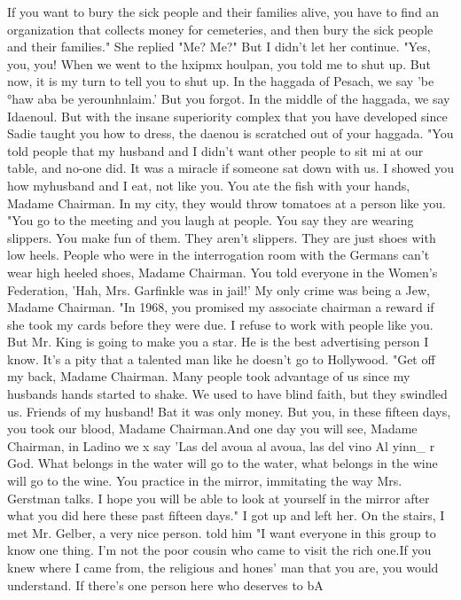 If you want to 
bury the sick people and their families alive, you have to find an organization that 
collects money for cemeteries, and then bury the sick people and their families."
She replied "Me?
Me?"
But I didn't let her continue.
"Yes, you, you!
When we went to the hxipmx houlpan, you told me to shut up.
But 
now, it is my turn to tell you to shut up.
In the haggada of Pesach, we say 'be 
°haw aba be yerounhnlaim.'
But you forgot.
In the middle of the haggada, we say 
Idaenoul.
But with the insane superiority complex that you have developed since Sadie 
taught you how to dress, the daenou is scratched out of your haggada.
"You told people that my husband and I didn't want other people to sit mi at our 
table, and no-one did.
It was a miracle if someone sat down with us.
I showed you 
how myhusband and I eat, not like you.
You ate the fish with your hands, Madame 
Chairman.
In my city, they would throw tomatoes at a person like you.
"You go to the meeting and you laugh at people.
You say they are wearing slippers.
You make fun of them.
They aren't slippers.
They are just shoes with low heels.
People who were in the interrogation room with the Germans can't wear high heeled shoes, 
Madame Chairman.
You told everyone in the Women's Federation, 'Hah, Mrs.
Garfinkle 
was in jail!'
My only crime was being a Jew, Madame Chairman.
"In 1968, you promised my associate chairman a reward if she took my cards before 
they were due.
I refuse to work with people like you.
But Mr.
King is going to make 
you a star.
He is the best advertising person I know.
It's a pity that a talented 
man like he doesn't go to Hollywood.
"Get off my back, Madame Chairman.
Many people took advantage of us since my 
husbands hands started to shake.
We used to have blind faith, but they swindled us.
Friends of my husband!
Bat it was only money.
But you, in these fifteen days, you 
took our blood, Madame Chairman.And one day you will see, Madame Chairman, in Ladino we x 
say 'Las del avoua al avoua, las del vino Al yinn_ r 
God.
What belongs in the water will go to the water, what belongs in the wine will go 
to the wine.
You practice in the mirror, immitating the way Mrs.
Gerstman talks.
I 
hope you will be able to look at yourself in the mirror after what you did here these 
past fifteen days."
I got up and left her.
On the stairs, I met Mr.
Gelber, a very nice person.
told him "I want everyone in this group to know one thing.
I'm not the poor cousin 
who came to visit the rich one.If you knew where I came from, the religious and hones' 
man that you are, you would understand.
If there's one person here who deserves to bA 
